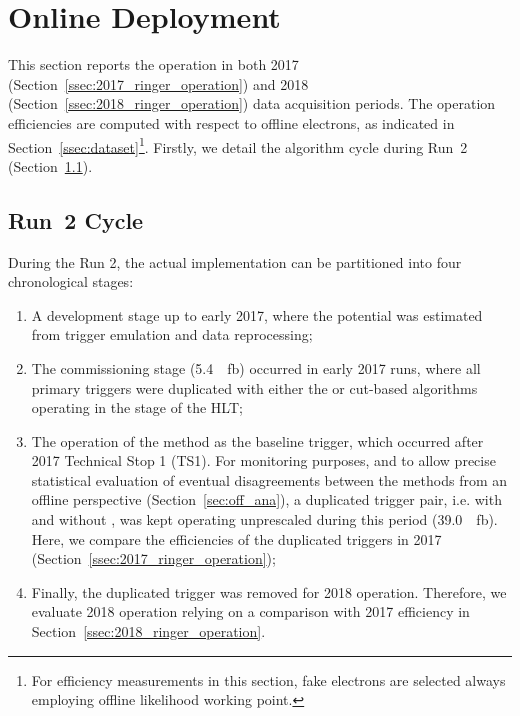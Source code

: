 \chapter{Online Deployment}%
\label{sec:operation}



This section reports the \rnn{} operation in both 2017
(Section~\ref{ssec:2017_ringer_operation}) and 2018
(Section~\ref{ssec:2018_ringer_operation}) data acquisition periods. The operation efficiencies
are computed with respect to offline electrons, as indicated in
Section~\ref{ssec:dataset}\footnote{For efficiency measurements in this section,
	fake electrons are selected always employing \veto\vloose{} offline likelihood
	working point.}. Firstly, we detail the algorithm cycle during Run~2
(Section~\ref{ssec:run2_rnn_cycle}).

\section{Run~2 \rnn{} Cycle}\label{ssec:run2_rnn_cycle}

During the Run 2, the actual \rnn{} implementation
can be partitioned into four chronological stages:

\begin{enumerate}[i]
  \item A development stage up to early 2017, where the \rnn{}
      potential was estimated from trigger emulation and data reprocessing;
  \item The commissioning stage (\SI{5.4}{\per\femto\barn}) occurred in
      early 2017 runs, where all primary
      triggers were duplicated with either the \rnn{} or cut-based algorithms
      operating in the \fastcalo{} stage of the HLT;
  \item The operation of the method as the baseline trigger, which occurred after 2017 Technical Stop 1 (TS1). For
    monitoring purposes, and to allow precise statistical evaluation of eventual
    disagreements between the \fastcalo{} methods from an offline
    perspective (Section~\ref{sec:off_ana}), a duplicated trigger pair, i.e.
    with and without \rnn{}, was kept operating unprescaled during this period
    (\SI{39.0}{\per\femto\barn}). Here, we compare the efficiencies of the
    duplicated triggers in 2017 (Section~\ref{ssec:2017_ringer_operation});
  \item Finally, the duplicated trigger was removed for 2018 operation.
    Therefore, we evaluate 2018 \rnn{} operation relying on a comparison with
    2017 efficiency in Section~\ref{ssec:2018_ringer_operation}.
\end{enumerate}

